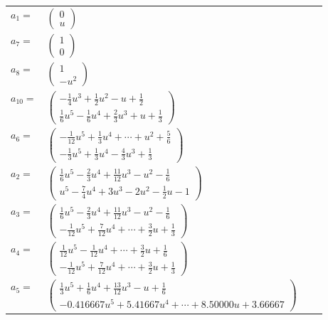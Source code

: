 \documentclass[1p]{elsarticle_modified}
\theoremstyle{definition}
\begin{document}
\begin{tabular}{m{7pt} m{180pt} m{7pt} m{180pt} }
\flushright $a_{1}=$&$\begin{pmatrix}0\\u\end{pmatrix}$ \\
\flushright $a_{7}=$&$\begin{pmatrix}1\\0\end{pmatrix}$ \\
\flushright $a_{8}=$&$\begin{pmatrix}1\\- u^2\end{pmatrix}$ \\
\flushright $a_{10}=$&$\begin{pmatrix}-\frac{1}{4} u^3+\frac{1}{2} u^2- u+\frac{1}{2}\\\frac{1}{6} u^5-\frac{1}{6} u^4+\frac{2}{3} u^3+u+\frac{1}{3}\end{pmatrix}$ \\
\flushright $a_{6}=$&$\begin{pmatrix}-\frac{1}{12} u^5+\frac{1}{3} u^4+\cdots+u^2+\frac{5}{6}\\-\frac{1}{3} u^5+\frac{1}{3} u^4-\frac{4}{3} u^3+\frac{1}{3}\end{pmatrix}$ \\
\flushright $a_{2}=$&$\begin{pmatrix}\frac{1}{6} u^5-\frac{2}{3} u^4+\frac{11}{12} u^3- u^2-\frac{1}{6}\\u^5-\frac{7}{4} u^4+3 u^3-2 u^2-\frac{1}{2} u-1\end{pmatrix}$ \\
\flushright $a_{3}=$&$\begin{pmatrix}\frac{1}{6} u^5-\frac{2}{3} u^4+\frac{11}{12} u^3- u^2-\frac{1}{6}\\-\frac{1}{12} u^5+\frac{7}{12} u^4+\cdots+\frac{3}{2} u+\frac{1}{3}\end{pmatrix}$ \\
\flushright $a_{4}=$&$\begin{pmatrix}\frac{1}{12} u^5-\frac{1}{12} u^4+\cdots+\frac{3}{2} u+\frac{1}{6}\\-\frac{1}{12} u^5+\frac{7}{12} u^4+\cdots+\frac{3}{2} u+\frac{1}{3}\end{pmatrix}$ \\
\flushright $a_{5}=$&$\begin{pmatrix}\frac{1}{3} u^5+\frac{1}{6} u^4+\frac{13}{12} u^3- u+\frac{1}{6}\\-0.416667 u^{5}+5.41667 u^{4}+\cdots+8.50000 u+3.66667\end{pmatrix}$ \\

\end{tabular}
\end{document}

